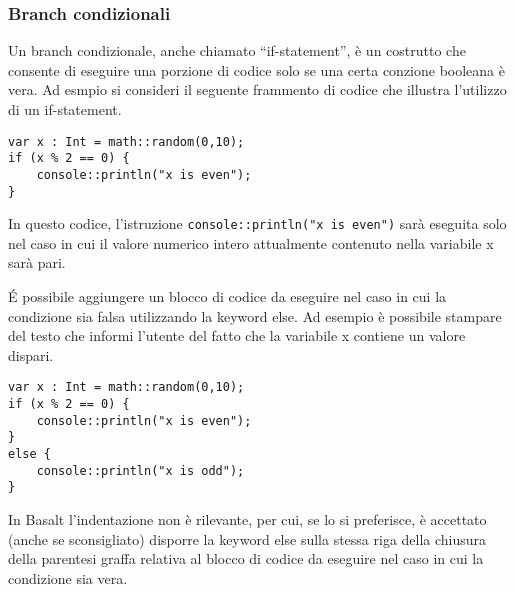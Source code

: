 \subsubsection{Branch condizionali}
Un branch condizionale, anche chiamato “if-statement”, è un costrutto che consente di eseguire una porzione di codice solo se una certa conzione booleana è vera. Ad esmpio si consideri 
il seguente frammento di codice che illustra l’utilizzo di un if-statement.


\vspace{0.5cm}

\begin{lstlisting}[frame=single]
var x : Int = math::random(0,10);
if (x % 2 == 0) {
    console::println("x is even");
}
\end{lstlisting}


\vspace{0.5cm}

In questo codice, l’istruzione \texttt{console::println("x is even")} sarà eseguita solo nel caso in cui il valore numerico intero attualmente contenuto nella variabile x sarà pari. 

É possibile aggiungere un blocco di codice da eseguire nel caso in cui la condizione sia falsa utilizzando la keyword else. Ad esempio è possibile stampare del testo che 
informi l’utente del fatto che la variabile x contiene un valore dispari.

\vspace{0.5cm}

\begin{lstlisting}[frame=single]
var x : Int = math::random(0,10);
if (x % 2 == 0) {
    console::println("x is even");
}
else {
    console::println("x is odd");
}    
\end{lstlisting}


\vspace{0.5cm}

In Basalt l’indentazione non è rilevante, per cui, se lo si preferisce, è accettato (anche se sconsigliato) disporre la keyword else sulla stessa riga della 
chiusura della parentesi graffa relativa al blocco di codice da eseguire nel caso in cui la condizione sia vera.